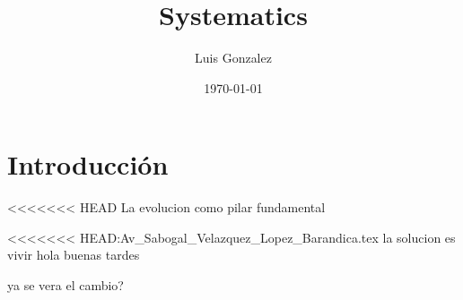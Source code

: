 \documentclass[12pt]{article}
\title{Systematics}
\author{Luis Gonzalez}
\date{\today}
\begin{document}
\maketitle

\section{Introducción}
<<<<<<< HEAD
La evolucion como pilar fundamental 

<<<<<<< HEAD:Av_Sabogal_Velazquez_Lopez_Barandica.tex
la solucion es vivir
hola buenas tardes

ya se vera el cambio?
\end{document}
